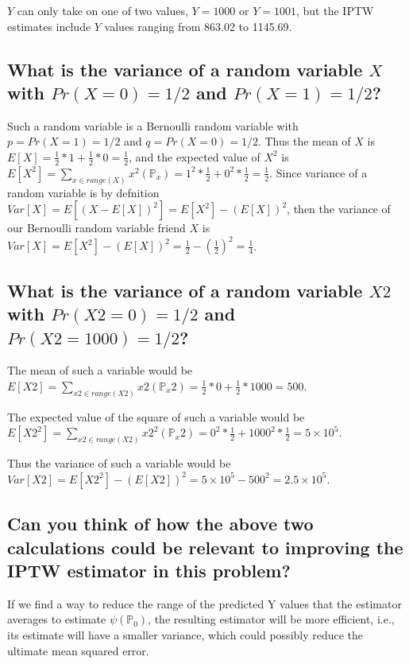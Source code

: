 \documentclass{article}\usepackage[]{graphicx}\usepackage[]{xcolor}
\begin{document}
$Y$ can only take on one of two values, $Y = 1000$ or $Y = 1001$, but the IPTW estimates include $Y$ values ranging from 863.02 to 1145.69.
  
  \subsection{What is the variance of a random variable $X$ with $Pr(X = 0) = 1/2$ and $Pr(X = 1) = 1/2$?}
  
Such a random variable is a Bernoulli random variable with $p = Pr(X = 1) = 1/2$ and $q = Pr(X = 0) = 1/2$. Thus the mean of $X$ is $E[X]=\frac{1}{2}*1+\frac{1}{2}*0=\frac{1}{2}$, and the expected value of $X^2$ is $E[X^2] = \sum_{x\in range(X)}x^2(\mathbb{P}_x) = 1^2*\frac{1}{2}+0^2*\frac{1}{2} = \frac{1}{2}$. Since variance of a random variable is by defnition $Var[X]=E[(X-E[X])^2]=E[X^2]-(E[X])^2$, then the variance of our Bernoulli random variable friend $X$ is $Var[X] = E[X^2]-(E[X])^2 = \frac{1}{2} - (\frac{1}{2})^2 = \frac{1}{4}$.

  \subsection{What is the variance of a random variable $X2$ with $Pr(X2 = 0) = 1/2$ and $Pr(X2 = 1000) = 1/2$?}
  
The mean of such a variable would be $E[X2]=\sum_{x2\in range(X2)}x2(\mathbb{P}_x2) = \frac{1}{2}*0+\frac{1}{2}*1000 = 500$.

The expected value of the square of such a variable would be $E[X2^2]=\sum_{x2\in range(X2)}x2^2(\mathbb{P}_x2)=0^2*\frac{1}{2}+1000^2*\frac{1}{2} = \ensuremath{5\times 10^{5}}$.

Thus the variance of such a variable would be $Var[X2] = E[X2^2]-(E[X2])^2 = \ensuremath{5\times 10^{5}} - 500^2 = \ensuremath{2.5\times 10^{5}}$.
  
  \subsection{Can you think of how the above two calculations could be relevant to improving the IPTW estimator in this problem?}
  
If we find a way to reduce the range of the predicted Y values that the estimator averages to estimate $\psi(\mathbb{P}_0)$, the resulting estimator will be more efficient, i.e., its estimate will have a smaller variance, which could possibly reduce the ultimate mean squared error. 
  
\end{document}
